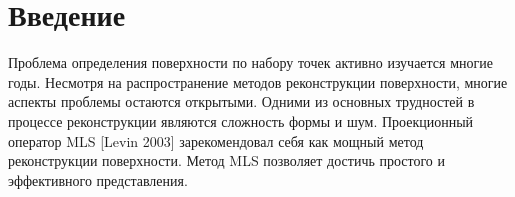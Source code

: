 \section*{Введение} 
Проблема определения поверхности по набору точек активно изучается многие годы. Несмотря на распространение методов реконструкции поверхности, многие аспекты проблемы остаются открытыми. Одними из основных трудностей в процессе реконструкции являются сложность формы и шум.  Проекционный оператор MLS [Levin 2003] зарекомендовал себя как мощный метод реконструкции поверхности. 
Метод MLS позволяет достичь простого и эффективного представления.




%
%
%
%
